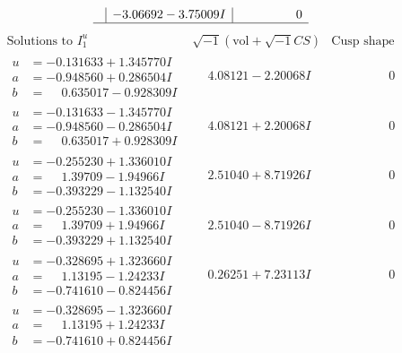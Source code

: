 \documentclass[1p]{elsarticle_modified}
\theoremstyle{definition}
\newcommand{\I}{\sqrt{-1}}
\begin{document}
$$\begin{array}{c|c|c}
 & -3.06692 - 3.75009 I & \phantom{-0.000000 } 0\\
 \hline 
 \end{array}$$\newpage$$\begin{array}{c|c|c}  
\text{Solutions to }I^u_{1}& \I (\text{vol} + \sqrt{-1}CS) & \text{Cusp shape}\\
 \hline 
\begin{aligned}
u &= -0.131633 + 1.345770 I \\
a &= -0.948560 + 0.286504 I \\
b &= \phantom{-}0.635017 - 0.928309 I\end{aligned}
 & \phantom{-}4.08121 - 2.20068 I & \phantom{-0.000000 } 0 \\ \hline\begin{aligned}
u &= -0.131633 - 1.345770 I \\
a &= -0.948560 - 0.286504 I \\
b &= \phantom{-}0.635017 + 0.928309 I\end{aligned}
 & \phantom{-}4.08121 + 2.20068 I & \phantom{-0.000000 } 0 \\ \hline\begin{aligned}
u &= -0.255230 + 1.336010 I \\
a &= \phantom{-}1.39709 - 1.94966 I \\
b &= -0.393229 - 1.132540 I\end{aligned}
 & \phantom{-}2.51040 + 8.71926 I & \phantom{-0.000000 } 0 \\ \hline\begin{aligned}
u &= -0.255230 - 1.336010 I \\
a &= \phantom{-}1.39709 + 1.94966 I \\
b &= -0.393229 + 1.132540 I\end{aligned}
 & \phantom{-}2.51040 - 8.71926 I & \phantom{-0.000000 } 0 \\ \hline\begin{aligned}
u &= -0.328695 + 1.323660 I \\
a &= \phantom{-}1.13195 - 1.24233 I \\
b &= -0.741610 - 0.824456 I\end{aligned}
 & \phantom{-}0.26251 + 7.23113 I & \phantom{-0.000000 } 0 \\ \hline\begin{aligned}
u &= -0.328695 - 1.323660 I \\
a &= \phantom{-}1.13195 + 1.24233 I \\
b &= -0.741610 + 0.824456 I\end{aligned}

\end{array}$$
\end{document}
